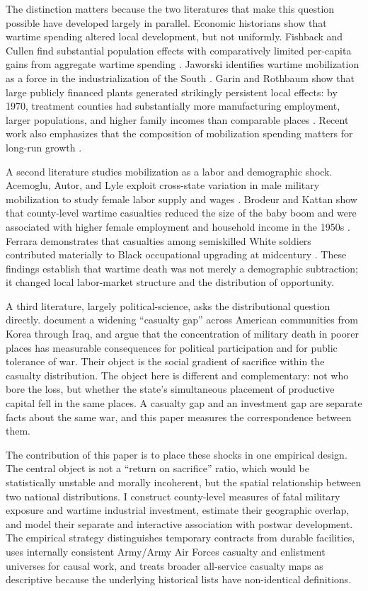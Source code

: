 \documentclass[12pt]{article}
\newcommand{\parencite}[1]{\citep{#1}}
\newcommand{\textcite}[1]{\citet{#1}}
\begin{document}
The distinction matters because the two literatures that make this question possible have developed largely in parallel. Economic historians show that wartime spending altered local development, but not uniformly. Fishback and Cullen find substantial population effects with comparatively limited per-capita gains from aggregate wartime spending \parencite{fishback2013}. Jaworski identifies wartime mobilization as a force in the industrialization of the South \parencite{jaworski2017}. Garin and Rothbaum show that large publicly financed plants generated strikingly persistent local effects: by 1970, treatment counties had substantially more manufacturing employment, larger populations, and higher family incomes than comparable places \parencite{garin2025}. Recent work also emphasizes that the composition of mobilization spending matters for long-run growth \parencite{jaworskiyang2025,brunet2026}.

A second literature studies mobilization as a labor and demographic shock. Acemoglu, Autor, and Lyle exploit cross-state variation in male military mobilization to study female labor supply and wages \parencite{acemoglu2004}. Brodeur and Kattan show that county-level wartime casualties reduced the size of the baby boom and were associated with higher female employment and household income in the 1950s \parencite{brodeur2022}. Ferrara demonstrates that casualties among semiskilled White soldiers contributed materially to Black occupational upgrading at midcentury \parencite{ferrara2022}. These findings establish that wartime death was not merely a demographic subtraction; it changed local labor-market structure and the distribution of opportunity.

A third literature, largely political-science, asks the distributional question directly. \textcite{krinershen2010} document a widening ``casualty gap'' across American communities from Korea through Iraq, and argue that the concentration of military death in poorer places has measurable consequences for political participation and for public tolerance of war. Their object is the social gradient of sacrifice within the casualty distribution. The object here is different and complementary: not who bore the loss, but whether the state's simultaneous placement of productive capital fell in the same places. A casualty gap and an investment gap are separate facts about the same war, and this paper measures the correspondence between them.

The contribution of this paper is to place these shocks in one empirical design. The central object is not a ``return on sacrifice'' ratio, which would be statistically unstable and morally incoherent, but the spatial relationship between two national distributions. I construct county-level measures of fatal military exposure and wartime industrial investment, estimate their geographic overlap, and model their separate and interactive association with postwar development. The empirical strategy distinguishes temporary contracts from durable facilities, uses internally consistent Army/Army Air Forces casualty and enlistment universes for causal work, and treats broader all-service casualty maps as descriptive because the underlying historical lists have non-identical definitions.
\end{document}
